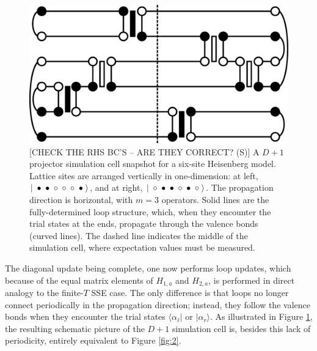 \documentclass[vecphys]{svmult}
\begin{document}
\begin{figure}[t]
\centering
\includegraphics*[width=.85\textwidth]{zeroT_heis.eps}
\caption[]{{\color{red}[CHECK THE RHS BC'S -- ARE THEY CORRECT? (S)]} A $D+1$ projector simulation cell snapshot for a six-site Heisenberg model.  Lattice sites are arranged vertically in one-dimension: 
at left, $ |  \hspace{1mm} \bullet  \hspace{1mm} \bullet  \hspace{1mm} \circ  \hspace{1mm} \circ  \hspace{1mm} \circ  \hspace{1mm} \bullet  \hspace{1mm} \rangle$, and at right,  $ |  \hspace{1mm} \circ  \hspace{1mm} \bullet  \hspace{1mm} \bullet  \hspace{1mm} \circ  \hspace{1mm} \bullet  \hspace{1mm} \circ \hspace{1mm}  \rangle$.
The propagation direction is horizontal, with $m=3$ operators.  Solid lines are the fully-determined loop structure, which, when they encounter the trial states at the ends, propagate through the valence bonds (curved lines).  The dashed line indicates the middle of the simulation cell, where expectation values must be measured.}
\label{fig:3}       %
\end{figure} 

The diagonal update being complete, one now performs loop updates, which because of the equal matrix elements of $H_{1,a}$ and $H_{2,a}$, is performed in direct analogy to the finite-$T$ SSE case.  The only difference is that loops no longer connect periodically in the propagation direction; instead, they follow the valence bonds when they encounter the trial states $\langle \alpha_{\ell} |$ or $| \alpha_r \rangle$.  As illustrated in Figure \ref{fig:3}, the resulting schematic picture of the $D+1$ simulation cell is, besides this lack of periodicity, entirely equivalent to Figure \ref{fig:2}.
\end{document}
